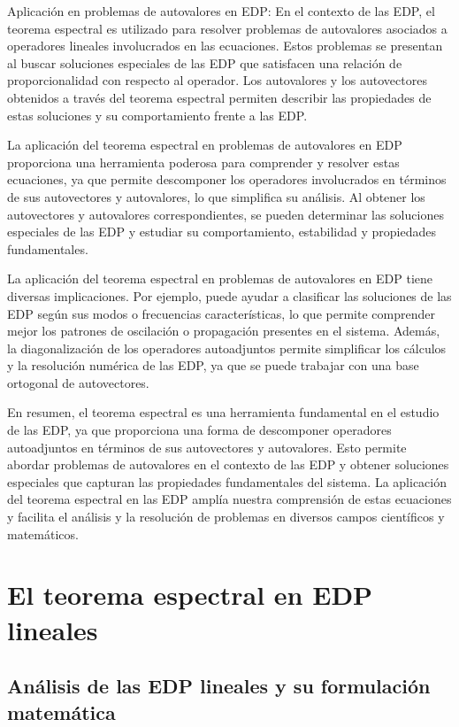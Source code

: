 \documentclass{article}
\begin{document}
    Aplicación en problemas de autovalores en EDP: En el contexto de las EDP, el teorema espectral es utilizado para resolver problemas de autovalores asociados a operadores lineales involucrados en las ecuaciones. Estos problemas se presentan al buscar soluciones especiales de las EDP que satisfacen una relación de proporcionalidad con respecto al operador. Los autovalores y los autovectores obtenidos a través del teorema espectral permiten describir las propiedades de estas soluciones y su comportamiento frente a las EDP.

    La aplicación del teorema espectral en problemas de autovalores en EDP proporciona una herramienta poderosa para comprender y resolver estas ecuaciones, ya que permite descomponer los operadores involucrados en términos de sus autovectores y autovalores, lo que simplifica su análisis. Al obtener los autovectores y autovalores correspondientes, se pueden determinar las soluciones especiales de las EDP y estudiar su comportamiento, estabilidad y propiedades fundamentales.

    La aplicación del teorema espectral en problemas de autovalores en EDP tiene diversas implicaciones. Por ejemplo, puede ayudar a clasificar las soluciones de las EDP según sus modos o frecuencias características, lo que permite comprender mejor los patrones de oscilación o propagación presentes en el sistema. Además, la diagonalización de los operadores autoadjuntos permite simplificar los cálculos y la resolución numérica de las EDP, ya que se puede trabajar con una base ortogonal de autovectores.

    En resumen, el teorema espectral es una herramienta fundamental en el estudio de las EDP, ya que proporciona una forma de descomponer operadores autoadjuntos en términos de sus autovectores y autovalores. Esto permite abordar problemas de autovalores en el contexto de las EDP y obtener soluciones especiales que capturan las propiedades fundamentales del sistema. La aplicación del teorema espectral en las EDP amplía nuestra comprensión de estas ecuaciones y facilita el análisis y la resolución de problemas en diversos campos científicos y matemáticos.


\newpage

\section{El teorema espectral en EDP lineales}
    \subsection{Análisis de las EDP lineales y su formulación matemática}
\end{document}
